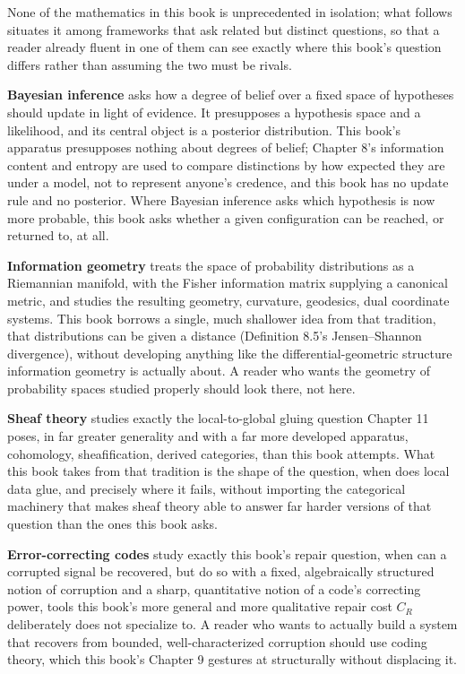 \documentclass[11pt]{book}
\begin{document}
None of the mathematics in this book is unprecedented in isolation; what follows situates it among frameworks that ask related but distinct questions, so that a reader already fluent in one of them can see exactly where this book's question differs rather than assuming the two must be rivals.

\textbf{Bayesian inference} asks how a degree of belief over a fixed space of hypotheses should update in light of evidence. It presupposes a hypothesis space and a likelihood, and its central object is a posterior distribution. This book's apparatus presupposes nothing about degrees of belief; Chapter 8's information content and entropy are used to compare distinctions by how expected they are under a model, not to represent anyone's credence, and this book has no update rule and no posterior. Where Bayesian inference asks which hypothesis is now more probable, this book asks whether a given configuration can be reached, or returned to, at all.

\textbf{Information geometry} treats the space of probability distributions as a Riemannian manifold, with the Fisher information matrix supplying a canonical metric, and studies the resulting geometry, curvature, geodesics, dual coordinate systems. This book borrows a single, much shallower idea from that tradition, that distributions can be given a distance (Definition 8.5's Jensen--Shannon divergence), without developing anything like the differential-geometric structure information geometry is actually about. A reader who wants the geometry of probability spaces studied properly should look there, not here.

\textbf{Sheaf theory} studies exactly the local-to-global gluing question Chapter 11 poses, in far greater generality and with a far more developed apparatus, cohomology, sheafification, derived categories, than this book attempts. What this book takes from that tradition is the shape of the question, when does local data glue, and precisely where it fails, without importing the categorical machinery that makes sheaf theory able to answer far harder versions of that question than the ones this book asks.

\textbf{Error-correcting codes} study exactly this book's repair question, when can a corrupted signal be recovered, but do so with a fixed, algebraically structured notion of corruption and a sharp, quantitative notion of a code's correcting power, tools this book's more general and more qualitative repair cost $C_R$ deliberately does not specialize to. A reader who wants to actually build a system that recovers from bounded, well-characterized corruption should use coding theory, which this book's Chapter 9 gestures at structurally without displacing it.
\end{document}
